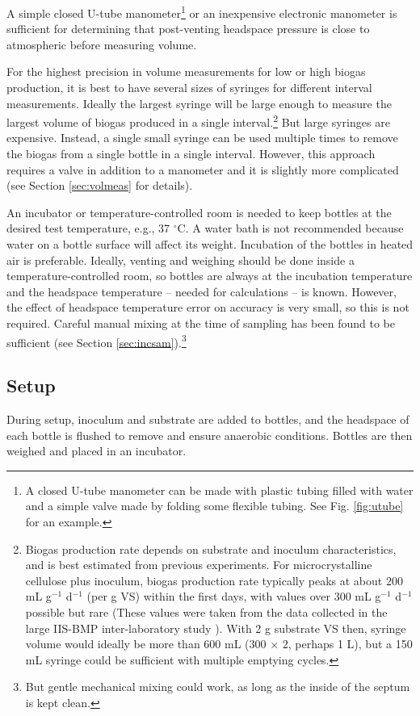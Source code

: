 \documentclass[]{article}
\begin{document}
A simple closed U-tube manometer\footnote{
  A closed U-tube manometer can be made with plastic tubing filled with water and a simple valve made by folding some flexible tubing. See Fig. \ref{fig:utube} for an example.  
} or an inexpensive electronic manometer is sufficient for determining that post-venting headspace pressure is close to atmospheric before measuring volume.

For the highest precision in volume measurements for low or high biogas production, it is best to have several sizes of syringes for different interval measurements.
Ideally the largest syringe will be large enough to measure the largest volume of biogas produced in a single interval.\footnote{
\label{fn:cellrate}
  Biogas production rate depends on substrate and inoculum characteristics, and is best estimated from previous experiments.
  For microcrystalline cellulose plus inoculum, biogas production rate typically peaks at about 200 mL g$^{-1}$ d$^{-1}$ (per g VS) within the first days, with values over 300 mL g$^{-1}$ d$^{-1}$ possible but rare  
  (These values were taken from the data collected in the large IIS-BMP inter-laboratory study \citep{hafnerImprovingInterlaboratoryReproducibility2020}).
  With 2 g substrate VS then, syringe volume would ideally be more than 600 mL (300 $\times$ 2, perhaps 1 L), but a 150 mL syringe could be sufficient with multiple emptying cycles.
}
But large syringes are expensive.
Instead, a single small syringe can be used multiple times to remove the biogas from a single bottle in a single interval.
However, this approach requires a valve in addition to a manometer and it is slightly more complicated (see Section \ref{sec:volmeas} for details).

An incubator or temperature-controlled room is needed to keep bottles at the desired test temperature, e.g., 37 $^\circ$C.
A water bath is not recommended because water on a bottle surface will affect its weight.
Incubation of the bottles in heated air is preferable.
Ideally, venting and weighing should be done inside a temperature-controlled room, so bottles are always at the incubation temperature and the headspace temperature -- needed for calculations -- is known.
However, the effect of headspace temperature error on accuracy is very small, so this is not required.
Careful manual mixing at the time of sampling has been found to be sufficient (see Section \ref{sec:incsam}).\footnote{But gentle mechanical mixing could work, as long as the inside of the septum is kept clean.}

\subsection{Setup}
During setup, inoculum and substrate are added to bottles, and the headspace of each bottle is flushed to remove  and ensure anaerobic conditions. Bottles are then weighed and placed in an incubator.
\end{document}
